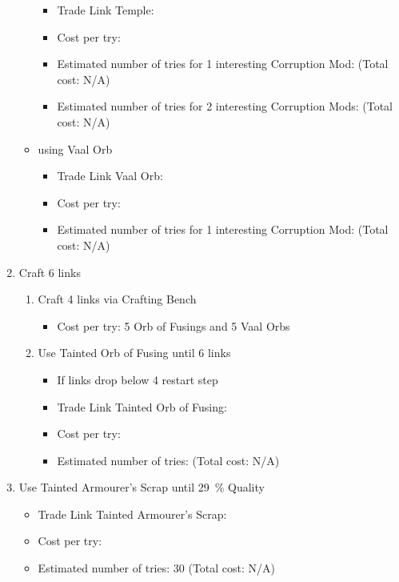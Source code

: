 \begin{enumerate}
\begin{itemize}
		\begin{itemize}
			\item Trade Link Temple:
			\item Cost per try:
			\item Estimated number of tries for 1 interesting Corruption Mod: (Total cost: N/A)
			\item Estimated number of tries for 2 interesting Corruption Mods: (Total cost: N/A)
		\end{itemize}		
		\item using Vaal Orb
		\begin{itemize}
			\item Trade Link Vaal Orb:
			\item Cost per try:
			\item Estimated number of tries for 1 interesting Corruption Mod: (Total cost: N/A)
		\end{itemize}		
	\end{itemize}
	\item Craft 6 links
	\begin{enumerate}
		\item Craft 4 links via Crafting Bench
		\begin{itemize}
			\item Cost per try: 5 Orb of Fusings and 5 Vaal Orbs
		\end{itemize}		
		\item Use Tainted Orb of Fusing until 6 links
		\begin{itemize}
			\item If links drop below 4 restart step
			\item Trade Link Tainted Orb of Fusing:
			\item Cost per try:
			\item Estimated number of tries: (Total cost: N/A)
		\end{itemize}		
	\end{enumerate}
	\item Use Tainted Armourer's Scrap until \SI{29}{\percent} Quality
	\begin{itemize}
		\item Trade Link Tainted Armourer's Scrap:
		\item Cost per try:
		\item Estimated number of tries: 30 (Total cost: N/A)
	\end{itemize}		
\end{enumerate}
	
